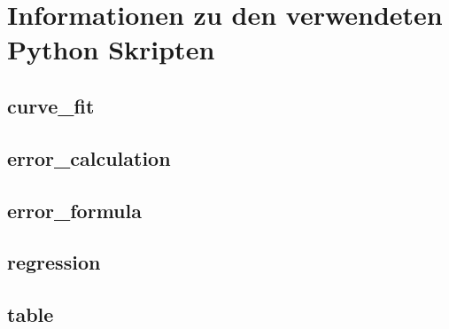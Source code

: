 \section{Informationen zu den verwendeten Python Skripten}
\subsection{curve_fit}
\subsection{error_calculation}
\subsection{error_formula}
\subsection{regression}
\subsection{table}
